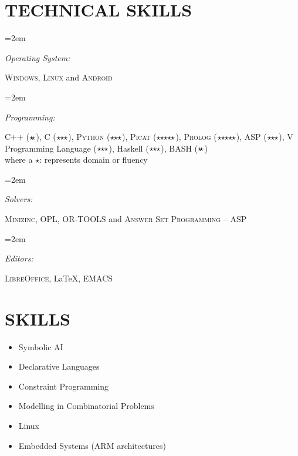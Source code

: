 \documentclass[paper=a4,fontsize=11pt]{scrartcl} %
\newlength{\spacebox}
\newcommand{\NewPart}[1]{\section*{\uppercase{#1}}}
\newcommand{\PersonalEntry}[2]{
		\noindent\hangindent=2em\hangafter=0 %
		\parbox{\spacebox}{        %
		\textit{#1}}		       %
		\hspace{1.5em} #2 \par}    %
\newcommand{\SkillsEntry}[2]{      %
		\noindent\hangindent=2em\hangafter=0 %
		\parbox{\spacebox}{        %
		\textit{#1}}			   %
		\hspace{1.5em} #2 \par}    %
\begin{document}
\NewPart{Technical Skills}{}

\SkillsEntry{Operating System:} {\textsc{Windows}, \textsc{Linux}  and \textsc{Android}}
\SkillsEntry{Programming:} {\textsc{C++} ($\star\hspace{-1mm}\star$), \textsc{C} ($\star\hspace{-1mm}\star\hspace{-1mm}\star$), \textsc{Python} ($\star\hspace{-1mm}\star\hspace{-1mm}\star$), \textsc{Picat} ($\star\hspace{-1mm}\star\hspace{-1mm}\star\hspace{-1mm}\star\hspace{-1mm}\star$),  \textsc{Prolog} 
($\star\hspace{-1mm}\star\hspace{-1mm}\star\hspace{-1mm}\star\hspace{-1mm}\star$), ASP
($\star\hspace{-1mm}\star\hspace{-1mm}\star$),  V Programming Language ($\star\hspace{-1mm}\star\hspace{-1mm}\star$), Haskell 
($\star\hspace{-1mm}\star\hspace{-1mm}\star$), BASH ($\star\hspace{-1mm}\star$) \\ where a $\star$: represents domain or fluency}
\SkillsEntry{Solvers:} {\textsc{Minizinc}, \textsc{OPL},
 \textsc{OR-TOOLS} and  \textsc{Answer Set Programming -- ASP}}
\SkillsEntry{Editors:} {\textsc{LibreOffice}, \LaTeX, \textsc{EMACS}}



\NewPart{Skills}{}

\begin{itemize}
\setlength\itemsep{-2mm}
\item Symbolic AI
\item Declarative Languages
\item Constraint Programming
\item Modelling in Combinatorial Problems
\item Linux
\item Embedded Systems (ARM architectures)

\end{itemize}
\end{document}
